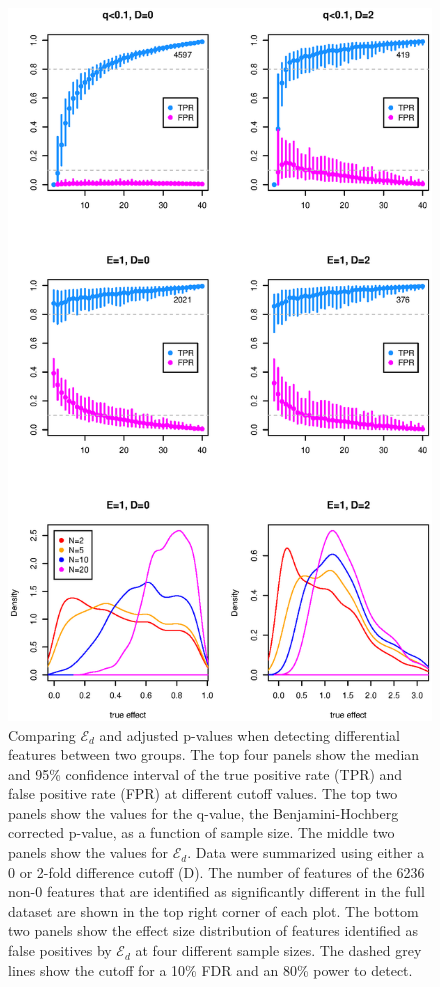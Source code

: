 \begin{figure}[tpb]
\centerline{\includegraphics[scale=0.5]{submission/F2-yeast_TPFP.eps}}
\caption{Comparing $\mathcal{E}_{d}$ and adjusted  p-values when detecting differential features between two groups. The top four panels show the   median and 95\% confidence interval of the true positive rate (TPR) and false positive rate (FPR) at different cutoff values.  The top two panels show the values for the q-value, the Benjamini-Hochberg corrected p-value, as a function of sample size. The middle two panels show the values for $\mathcal{E}_{d}$. Data were summarized using either a  0 or 2-fold difference cutoff (D). The number of features of the 6236 non-0 features that are identified as significantly different in the full dataset are shown in the top right corner of each plot. The bottom two panels show the effect size distribution of features identified as false positives by $\mathcal{E}_{d}$ at four different sample sizes. The dashed grey lines show the cutoff for a 10\% FDR and an 80\% power to detect.}
\label{fig:02}
\end{figure}


